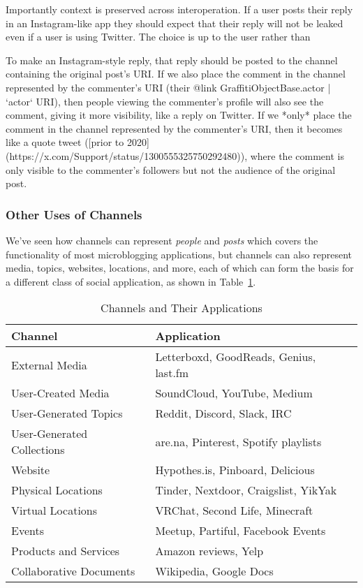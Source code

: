 Importantly context is preserved across interoperation.
If a user posts their reply in
an Instagram-like app they should expect that their reply will not be leaked even if
a user is using Twitter.
The choice is up to the user rather than

To make an Instagram-style reply, that reply should be posted to the channel
containing the original post's URI.
If we also place the comment in the channel represented by the commenter's URI (their
{@link GraffitiObjectBase.actor | `actor` URI}), then people viewing the commenter's profile
will also see the comment, giving it more visibility, like a reply on Twitter.
If we *only* place the comment in the channel represented by the commenter's URI, then
it becomes like a quote tweet ([prior to 2020](https://x.com/Support/status/1300555325750292480)),
where the comment is only visible to the commenter's followers but not the audience
of the original post.

\subsubsection{Other Uses of Channels}

We've seen how channels can represent \emph{people} and \emph{posts}
which covers the functionality of most microblogging applications,
but channels can also represent
media, topics, websites, locations, and more,
each of which can form the basis for a different class of
social application, as shown in Table~\ref{concepts:tab:channels}.

\begin{table}[h]
    \centering
    \begin{tabular}{|l|l|}
        \hline
        \textbf{Channel} & \textbf{Application} \\ \hline
        External Media & Letterboxd, GoodReads, Genius, last.fm \\ \hline
        User-Created Media & SoundCloud, YouTube, Medium \\ \hline
        User-Generated Topics & Reddit, Discord, Slack, IRC \\ \hline
        User-Generated Collections & are.na, Pinterest, Spotify playlists \\ \hline
        Website & Hypothes.is, Pinboard, Delicious \\ \hline
        Physical Locations & Tinder, Nextdoor, Craigslist, YikYak \\ \hline
        Virtual Locations & VRChat, Second Life, Minecraft \\ \hline
        Events & Meetup, Partiful, Facebook Events \\ \hline
        Products and Services & Amazon reviews, Yelp \\ \hline
        Collaborative Documents & Wikipedia, Google Docs \\ \hline
    \end{tabular}
    \caption{Channels and Their Applications}
    \label{concepts:tab:channels}
\end{table}

